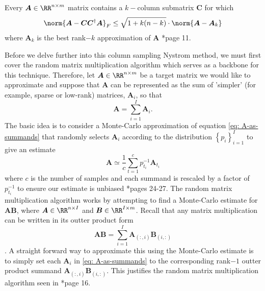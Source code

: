 \begin{thm} \label{lem: best-col-sel}
    Every $\bm{A} \in \RR^{n \times m}$ matrix contains a $k-$column submatrix $\bm{C}$ for which
    \[
        \norm{\bm{A} - \bm{C} \bm{C}^{\dagger} \bm{A}}_{F} \leq \sqrt{1 + k(n-k)} \cdot \norm{\bm{A} - \bm{A}_{k}}
    \]
    where $\bm{A}_k$ is the best rank$-k$ approximation of $\bm{A}$ \cite{halko2011finding}*{page 11}.
\end{thm}
Before we delve further into this column sampling Nystrom method, we must first cover the random matrix multiplication algorithm which serves as a backbone for this technique. Therefore, let $\bm{A} \in \RR^{n \times m}$ be a target matrix we would like to approximate and suppose that $\bm{A}$ can be represented as the sum of 'simpler' (for example, sparse or low-rank) matrices, $\bm{A}_i$, so that
\begin{equation} \label{eq: A-as-summands}
    \bm{A} = \sum_{i=1}^{I} \bm{A}_i .
\end{equation}
The basic idea is to consider a Monte-Carlo approximation of equation \ref{eq: A-as-summands} that randomly selects $\bm{A}_i$ according to the distribution $\left\{ p_i \right\}_{i=1}^{I}$ to give an estimate
\begin{equation}
    \bm{A} \simeq \frac{1}{c} \sum_{t=1}^{c} p_{t_i}^{-1} \bm{A}_{t_i}
\end{equation}
where $c$ is the number of samples and each summand is rescaled by a factor of $p_{t_i}^{-1}$ to ensure our estimate is unbiased \cite{martinsson2021randomized}*{pages 24-27}. The random matrix multiplication algorithm works by attempting to find a Monte-Carlo estimate for $\bm{A}\bm{B}$, where $\bm{A} \in \RR^{n \times I}$ and $\bm{B} \in \RR^{I \times m}$. Recall that any matrix multiplication can be written in its outter product form
\begin{equation*}
    \bm{A} \bm{B} = \sum_{i=1}^{I} \bm{A}_{(:,i)} \bm{B}_{(i,:)}
\end{equation*}
\cites{Roosta2020, doi:10.1137/S0097539704442684}. A straight forward way to approximate this using the Monte-Carlo estimate is to simply set each $\bm{A}_i$ in \ref{eq: A-as-summands} to the corresponding rank$-1$ outter product summand $\bm{A}_{(:,i)} \bm{B}_{(i,:)}$. This justifies the random matrix multiplication algorithm seen in  \cite{drineas2017lectures}*{page 16}.

